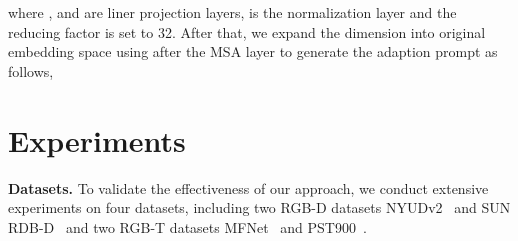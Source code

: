 \documentclass[10pt,twocolumn,letterpaper]{article}
\begin{document}
where ,  and  are liner projection layers,  is the normalization layer and the reducing factor  is set to 32. After that, we expand the dimension into original embedding space using  after the MSA layer to generate the adaption prompt  as follows,




\section{Experiments}
\label{sec:Experiments}

\noindent
\textbf{Datasets.} To validate the effectiveness of our approach, we conduct extensive experiments on four datasets, including two RGB-D datasets NYUDv2~\cite{nyuv2} and SUN RDB-D~\cite{sunrgbd} and two RGB-T datasets MFNet~\cite{mfnet} and PST900~\cite{pst900}.

\begin{table*}[h]
\LARGE
\centering
\setlength{\tabcolsep}{5pt}
\renewcommand{\arraystretch}{1.1}
\caption{\centering RGB-D semantic segmentation on NYUDv2. ``SS'' and ``MS'' denote single- or multi-scale for the test of RGB-D segmentation. ``Params'' represents learnable parameters in all tables. The best two results are highlighted in \textbf{\color{red}{red}} and \textbf{\color{blue}{blue}} in all the comparison tables.}
\label{tb:1}
\vspace{-1mm}
\end{table*}
\end{document}
